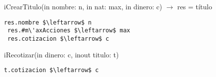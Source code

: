 
iCrearTitulo(in nombre: n, in nat: max, in dinero: c) $\rightarrow$ res = t\'itulo
\begin{lstlisting}[mathescape]
 res.nombre $\leftarrow$ n
 res.#m\'axAcciones $\leftarrow$ max
 res.cotizacion $\leftarrow$ c
\end{lstlisting}

iRecotizar(in dinero: c, inout titulo: t)
\begin{lstlisting}[mathescape]
t.cotizacion $\leftarrow$ c
\end{lstlisting}